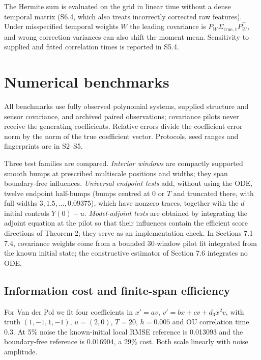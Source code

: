 \documentclass[ejs]{imsart}
\begin{document}
The Hermite sum is evaluated on the grid in linear time without a dense
temporal matrix (S6.4, which also treats incorrectly corrected raw
features). Under misspecified temporal weights \(W\) the leading
covariance is \(P_W\Sigma_{\mathrm{true},1}P_W^\top\), and wrong
correction variances can also shift the moment mean. Sensitivity to
supplied and fitted correlation times is reported in S5.4.

\section{Numerical benchmarks}\label{numerical-benchmarks}

All benchmarks use fully observed polynomial systems, supplied structure
and sensor covariance, and archived paired observations; covariance
pilots never receive the generating coefficients. Relative errors divide
the coefficient error norm by the norm of the true coefficient vector.
Protocols, seed ranges and fingerprints are in S2--S5.

Three test families are compared. \emph{Interior windows} are compactly
supported smooth bumps at prescribed multiscale positions and widths;
they span boundary-free influences. \emph{Universal endpoint tests} add,
without using the ODE, twelve endpoint half-bumps (bumps centred at
\(0\) or \(T\) and truncated there, with full widths
\(3,1.5,\ldots,0.09375\)), which have nonzero traces, together with the
\(d\) initial controls \(Y(0)-u\). \emph{Model-adjoint tests} are
obtained by integrating the adjoint equation at the pilot so that their
influences contain the efficient score directions of Theorem 2; they
serve as an implementation check. In Sections 7.1--7.4, covariance
weights come from a bounded 30-window pilot fit integrated from the
known initial state; the constructive estimator of Section 7.6
integrates no ODE.

\subsection{Information cost and finite-span
efficiency}\label{information-cost-and-finite-span-efficiency}

For Van der Pol we fit four coefficients in \(x'=a v\),
\(v'=b x+c v+d_3x^2v\), with truth \((1,-1,1,-1)\), \(u=(2,0)\),
\(T=20\), \(h=0.005\) and OU correlation time 0.3. At 5\% noise the
known-initial local RMSE reference is 0.013093 and the boundary-free
reference is 0.016904, a 29\% cost. Both scale linearly with noise
amplitude.
\end{document}
